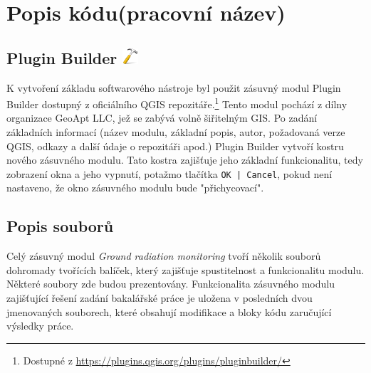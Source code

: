 \section{Popis kódu(pracovní název)}
\subsection[Plugin Builder]{Plugin Builder \includegraphics[scale=0.1]{./pictures/plugin_builder.png}}
K vytvoření základu softwarového nástroje byl použit zásuvný modul Plugin Builder dostupný z oficiálního QGIS repozitáře.\footnote{Dostupné z \url{https://plugins.qgis.org/plugins/pluginbuilder/}} Tento modul pochází z dílny organizace GeoApt LLC, jež se zabývá volně šiřitelným GIS. Po zadání základních informací (název modulu, základní popis, autor, požadovaná verze QGIS, odkazy a další údaje o repozitáři apod.) Plugin Builder vytvoří kostru nového zásuvného modulu. Tato kostra zajišťuje jeho základní funkcionalitu, tedy zobrazení okna a jeho vypnutí, potažmo tlačítka \texttt{OK | Cancel}, pokud není nastaveno, že okno zásuvného modulu bude "přichycovací". 

\subsection{Popis souborů}
Celý zásuvný modul \textit{Ground radiation monitoring} tvoří několik souborů dohromady tvořících balíček, který zajišťuje spustitelnost a funkcionalitu modulu. Některé soubory zde budou prezentovány. Funkcionalita zásuvného modulu zajišťující řešení zadání bakalářské práce je uložena v posledních dvou jmenovaných souborech, které obsahují modifikace a bloky kódu zaručující výsledky práce. %


